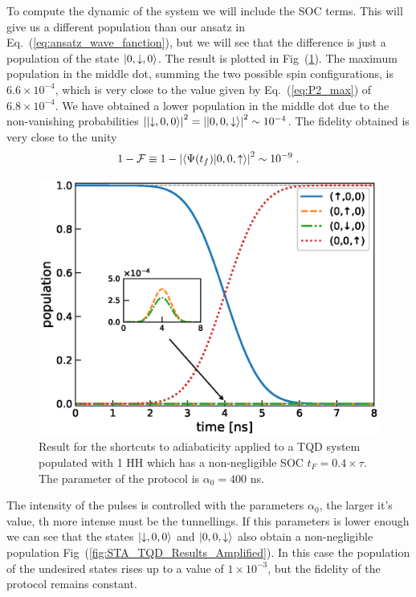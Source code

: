 \documentclass[a4paper,11pt]{article}
\begin{document}
To compute the dynamic of the system we will include the SOC terms. This will give us a different population than our ansatz in Eq.~(\ref{eq:ansatz_wave_fanction}), but we will see that the difference is just a population of the state $\ket{0,\downarrow,0}$. The result is plotted in Fig~(\ref{fig:STA_TQD_Results}). The maximum population in the middle dot, summing the two possible spin configurations, is $6.6\times 10^{-4}$, which is very close to the value given by Eq.~(\ref{eq:P2_max}) of $6.8\times 10^{-4}$. We have obtained a lower population in the middle dot due to the non-vanishing probabilities $\abs{\ket{\downarrow,0,0}}^2=\abs{\ket{0,0,\downarrow}}^2\sim 10^{-4}$. The fidelity obtained is very close to the unity
\begin{equation}
	1-\mathcal{F}\equiv1-\abs{\braket{\Psi(t_f)}{0,0,\uparrow}}^2\sim 10^{-9}\; .
\end{equation}
\begin{figure}[!htbp]
	\centering
	\includegraphics[width=0.8\linewidth]{STA_TQD_Results.eps}
	\caption{Result for the shortcuts to adiabaticity applied to a TQD system populated with 1 HH which has a non-negligible SOC $t_F=0.4\times\tau$. The parameter of the protocol is $\alpha_0=400$ ns.}
	\label{fig:STA_TQD_Results}
\end{figure}
The intensity of the pulses is controlled with the parameters $\alpha_0$, the larger it's value, th more intense must be the tunnellings. If this parameters is lower enough we can see that the states $\ket{\downarrow,0,0}$ and $\ket{0,0,\downarrow}$ also obtain a non-negligible  population Fig~(\ref{fig:STA_TQD_Results_Amplified}). In this case the population of the undesired states rises up to a value of $1\times 10^{-3}$, but the fidelity of the protocol remains constant.
\end{document}
